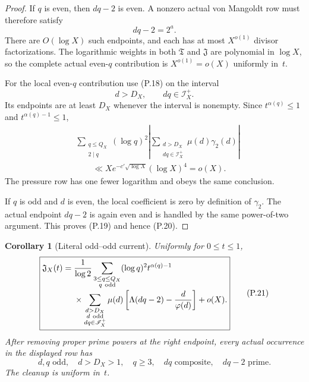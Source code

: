 \documentclass[11pt]{article}
\newtheorem{corollary}[theorem]{Corollary}
\theoremstyle{definition}
\theoremstyle{remark}
\begin{document}
\begin{proof}
If $q$ is even, then $dq-2$ is even.  A nonzero actual von Mangoldt row must
therefore satisfy
\[
 dq-2=2^a.
\]
There are $O(\log X)$ such endpoints, and each has at most $X^{o(1)}$
divisor factorizations.  The logarithmic weights in both
$\mathfrak T$ and $\mathfrak J$ are polynomial in $\log X$, so the complete
actual even-$q$ contribution is $X^{o(1)}=o(X)$ uniformly in~$t$.

For the local even-$q$ contribution use
\textup{(P.18)} on the interval
\[
 d>D_X,
 \qquad
 dq\in\mathscr I_X^+.
\]
Its endpoints are at least $D_X$ whenever the interval is nonempty.  Since
$t^{\alpha(q)}\le1$ and $t^{\alpha(q)-1}\le1$,
\[
 \begin{aligned}
 &\sum_{\substack{q\le Q_X\\2\mid q}}
  (\log q)^2
  \left|
   \sum_{\substack{d>D_X\\dq\in\mathscr I_X^+}}
   \mu(d)\gamma_2(d)
  \right|\\
 &\qquad\ll
 Xe^{-c'\sqrt{\log X}}(\log X)^4
 =o(X).
 \end{aligned}
\]
The pressure row has one fewer logarithm and obeys the same conclusion.

If $q$ is odd and $d$ is even, the local coefficient is zero by definition of
$\gamma_2$.  The actual endpoint $dq-2$ is again even and is handled by the
same power-of-two argument.  This proves \textup{(P.19)} and hence
\textup{(P.20)}.
\end{proof}

\begin{corollary}[Literal odd--odd current]
\label{cor:affpress-odd-odd-current}
Uniformly for $0\le t\le1$,
\begin{equation}
 \label{eq:affpress-odd-odd-current}
 \boxed{
 \begin{aligned}
 \mathfrak J_X(t)
 ={}&\frac1{\log2}
 \sum_{\substack{3\le q\le Q_X\\q\ {\rm odd}}}
 (\log q)^2t^{\alpha(q)-1}
 \\[-0.2em]
 &\times
 \sum_{\substack{d>D_X\\d\ {\rm odd}\\dq\in\mathscr I_X^+}}
 \mu(d)
 \left[
  \Lambda(dq-2)-\frac d{\varphi(d)}
 \right]
 +o(X).
 \end{aligned}}
 \tag{P.21}
\end{equation}
After removing proper prime powers at the right endpoint, every actual
occurrence in the displayed row has
\[
 \boxed{
 d,q\text{ odd},
 \quad d>D_X>1,
 \quad q\ge3,
 \quad dq\text{ composite},
 \quad dq-2\text{ prime}.}
\]
The cleanup is uniform in~$t$.
\end{corollary}
\end{document}
